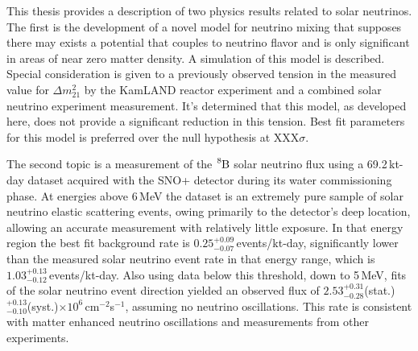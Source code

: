 

\begin{abstracts}
    This thesis provides a description of two physics results related
    to solar neutrinos.
    The first is the development of a novel model for neutrino mixing
    that supposes there may exists a potential that couples to neutrino
    flavor and is only significant in areas of near zero matter density.
    A simulation of this model is described. Special consideration
    is given to a previously observed tension in the measured value
    for $\Delta m^{2}_{21}$ by the KamLAND reactor experiment and
    a combined solar neutrino experiment measurement.
    It's determined that this model, as developed here, does not
    provide a significant reduction in this tension.
    Best fit parameters for this model is preferred over the
    null hypothesis at XXX$\sigma$.

    The second topic is
    a measurement of the $\ce{^{8}B}$ solar neutrino flux using a
    69.2\,kt-day dataset acquired with the
    SNO+ detector during its water
    commissioning phase.
    At energies above 6\,MeV the dataset is an extremely
    pure sample of solar neutrino elastic scattering events, owing primarily to
    the detector's deep location, allowing
    an accurate measurement with relatively little exposure. In that energy
    region the best fit background rate is
    $0.25^{+0.09}_{-0.07}$\,events/kt-day, significantly
    lower than the measured solar neutrino event rate in that energy range,
    which is $1.03^{+0.13}_{-0.12}$\,events/kt-day. Also using data below this threshold, down
    to 5\,MeV, fits of the solar neutrino event direction yielded an observed
    flux of
    $2.53^{+0.31}_{-0.28}$(stat.)$^{+0.13}_{-0.10}$(syst.)$\times10^6$\,cm$^{-2}$s$^{-1}$,
    assuming no neutrino oscillations. This rate is
    consistent with matter enhanced neutrino oscillations and measurements from
    other experiments.
\end{abstracts}

